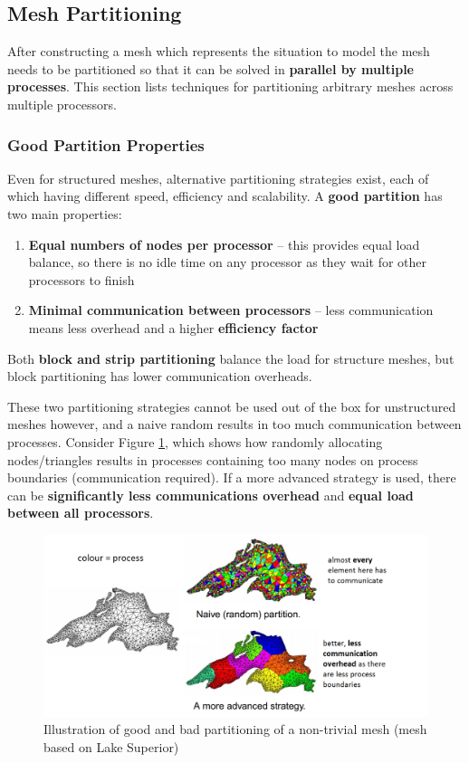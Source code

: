 \documentclass{article}
\begin{document}
\subsection{Mesh Partitioning}
\label{sec:mesh-partitioning}

After constructing a mesh which represents the situation to model the mesh needs to be partitioned so that it can be solved in \textbf{parallel by multiple processes}. This section lists techniques for partitioning arbitrary meshes across multiple processors.

\subsubsection{Good Partition Properties}

Even for structured meshes, alternative partitioning strategies exist, each of which having different speed, efficiency and scalability. A \textbf{good partition} has two main properties:
\begin{enumerate}
	\item \textbf{Equal numbers of nodes per processor} -- this provides equal load balance, so there is no idle time on any processor as they wait for other processors to finish
	\item \textbf{Minimal communication between processors} -- less communication means less overhead and a higher \textbf{efficiency factor}
\end{enumerate}
Both \textbf{block and strip partitioning} balance the load for structure meshes, but block partitioning has lower communication overheads.

These two partitioning strategies cannot be used out of the box for unstructured meshes however, and a naive random results in too much communication between processes. Consider Figure \ref{fig:unstructured-mesh-partition-example}, which shows how randomly allocating nodes/triangles results in processes containing too many nodes on process boundaries (communication required). If a more advanced strategy is used, there can be \textbf{significantly less communications overhead} and \textbf{equal load between all processors}.

\begin{figure}
	\centering
	\includegraphics[scale=0.4]{figures/lake-superior.png}
	\caption{Illustration of good and bad partitioning of a non-trivial mesh (mesh based on Lake Superior)}
	\label{fig:unstructured-mesh-partition-example}
\end{figure}
\end{document}
